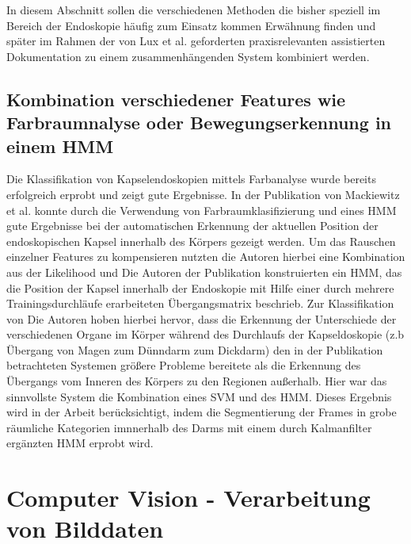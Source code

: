 In diesem Abschnitt sollen die verschiedenen Methoden die bisher speziell im Bereich der Endoskopie häufig zum Einsatz kommen Erwähnung finden und später im Rahmen der von Lux et al. geforderten praxisrelevanten assistierten Dokumentation zu einem zusammenhängenden System kombiniert werden.

\subsection{Kombination verschiedener Features wie Farbraumnalyse oder Bewegungserkennung in einem HMM}

Die Klassifikation von Kapselendoskopien mittels Farbanalyse wurde bereits erfolgreich erprobt und zeigt gute Ergebnisse. In der Publikation von Mackiewitz et al. konnte durch die Verwendung von Farbraumklasifizierung und eines HMM gute Ergebnisse bei der automatischen Erkennung der aktuellen Position der endoskopischen Kapsel innerhalb des Körpers gezeigt werden. Um das Rauschen einzelner Features zu kompensieren nutzten die Autoren hierbei eine Kombination aus der Likelihood und Die Autoren der Publikation konstruierten ein HMM, das die Position der Kapsel innerhalb der Endoskopie mit Hilfe einer durch mehrere Trainingsdurchläufe erarbeiteten Übergangsmatrix beschrieb. Zur Klassifikation von  Die Autoren hoben hierbei hervor, dass die Erkennung der Unterschiede der verschiedenen Organe im Körper während des Durchlaufs der Kapseldoskopie (z.b Übergang von Magen zum Dünndarm zum Dickdarm) den in der Publikation betrachteten Systemen größere Probleme bereitete als die Erkennung des Übergangs vom Inneren des Körpers zu den Regionen außerhalb. Hier war das sinnvollste System die Kombination eines SVM und des HMM. Dieses Ergebnis wird in der Arbeit berücksichtigt, indem die Segmentierung der Frames in grobe räumliche Kategorien imnnerhalb des Darms mit einem durch Kalmanfilter ergänzten HMM erprobt wird. \cite{4530644}


\section{Computer Vision - Verarbeitung von Bilddaten}


